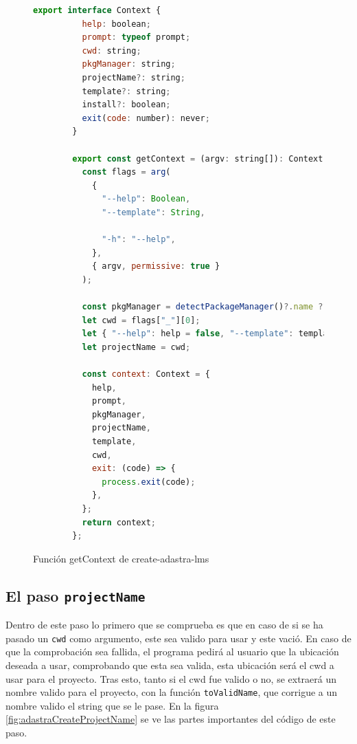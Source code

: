 \begin{figure}
    \begin{lstlisting}[language=Javascript]
        export interface Context {
          help: boolean;
          prompt: typeof prompt;
          cwd: string;
          pkgManager: string;
          projectName?: string;
          template?: string;
          install?: boolean;
          exit(code: number): never;
        }

        export const getContext = (argv: string[]): Context => {
          const flags = arg(
            {
              "--help": Boolean,
              "--template": String,
        
              "-h": "--help",
            },
            { argv, permissive: true }
          );
        
          const pkgManager = detectPackageManager()?.name ?? "npm";
          let cwd = flags["_"][0];
          let { "--help": help = false, "--template": template } = flags;
          let projectName = cwd;
        
          const context: Context = {
            help,
            prompt,
            pkgManager,
            projectName,
            template,
            cwd,
            exit: (code) => {
              process.exit(code);
            },
          };
          return context;
        };
    \end{lstlisting}
    \caption{Función getContext de create-adastra-lms}
    \label{fig:adastraCreateContext}
\end{figure}

\subsection{El paso {\tt projectName}}

Dentro de este paso lo primero que se comprueba es que en caso de si se ha pasado un \verb|cwd| como argumento, este sea valido para usar y este vació. En caso de que la comprobación sea fallida, el programa pedirá al usuario que la ubicación deseada a usar, comprobando que esta sea valida, esta ubicación será el cwd a usar para el proyecto. Tras esto, tanto si el cwd fue valido o no, se extraerá un nombre valido para el proyecto, con la función \verb|toValidName|, que corrigue a un nombre valido el string que se le pase. En la figura \ref{fig:adastraCreateProjectName} se ve las partes importantes del código de este paso.

